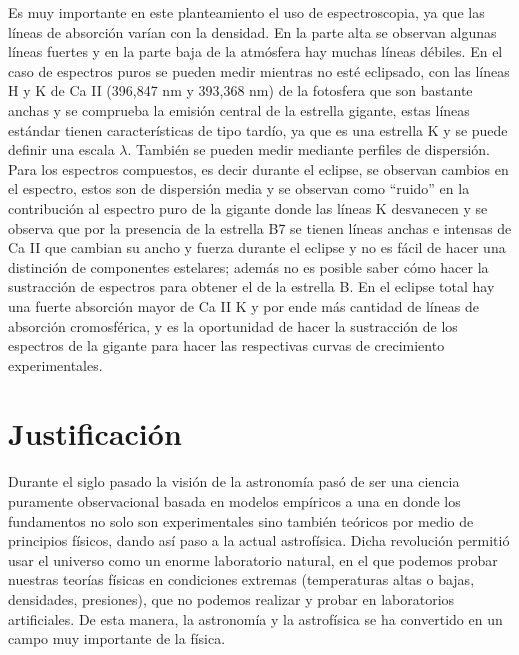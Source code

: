 \documentclass[11pt]{article}
\begin{document}
\noindent Es muy importante en este planteamiento el uso de espectroscopia, ya que las líneas de absorción varían con la densidad. En la parte alta se observan algunas líneas fuertes y en la parte baja de la atmósfera hay muchas líneas débiles. En el caso de espectros puros se pueden medir mientras no esté eclipsado, con las líneas H y K de Ca II (396,847 nm y 393,368 nm) de la fotosfera que son bastante anchas y se comprueba la emisión central de la estrella gigante, estas líneas estándar tienen características de tipo tardío, ya que es una estrella K y se puede definir una escala $\lambda$. También se pueden medir mediante perfiles de dispersión. Para los espectros compuestos, es decir durante el eclipse, se observan cambios en el espectro, estos son de dispersión media y se observan como ``ruido'' en la contribución al espectro puro de la gigante donde las líneas K desvanecen y se observa que por la presencia de la estrella B7 se tienen líneas anchas e intensas de Ca II que cambian su ancho y fuerza durante el eclipse y no es fácil de hacer una distinción de componentes estelares; además no es posible saber cómo hacer la sustracción de espectros para obtener el de la estrella B. En el eclipse total hay una fuerte absorción mayor de Ca II K y por ende más cantidad de líneas de absorción cromosférica, y es la oportunidad de hacer la sustracción de los espectros de la gigante para hacer las respectivas curvas de crecimiento experimentales. 



\section{Justificación}

\vspace{3mm}

Durante el siglo pasado la visión de la astronomía pasó de ser una ciencia puramente observacional basada en modelos empíricos a una en donde los fundamentos no solo son experimentales sino también teóricos por medio de principios físicos, dando así paso a la actual astrofísica. Dicha revolución permitió usar el universo como un enorme laboratorio natural, en el que podemos probar nuestras teorías físicas en condiciones extremas (temperaturas altas o bajas, densidades, presiones), que no podemos realizar y probar en laboratorios artificiales. De esta manera, la astronomía y la astrofísica se ha convertido en un campo muy importante de la física.
\end{document}

